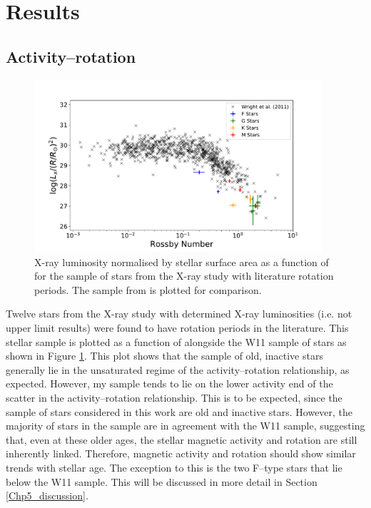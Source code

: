 \section{Results}

\subsection{Activity--rotation}
\label{Chp5_results_activity_rotation}

\begin{figure}[!ht]
    \centering
    \includegraphics[width=0.95\textwidth]{Figures/5-Activity_rotation/lx_v_R0.pdf}
    \caption[$L_{x}$ as a function of \Ro]{X-ray luminosity normalised by stellar surface area as a function of \Ro for the sample of stars from the X-ray study with literature rotation periods. The sample from \citet{Wright_etal_2011} is plotted for comparison.}
    \label{fig:lx_v_ro}
\end{figure}

Twelve stars from the X-ray study \citep{Booth_etal_2017} with determined X-ray luminosities (i.e. not upper limit results) were found to have rotation periods in the literature. This stellar sample is plotted as a function of \Ro alongside the W11 sample of stars as shown in Figure \ref{fig:lx_v_ro}. This plot shows that the sample of old, inactive stars generally lie in the unsaturated regime of the activity--rotation relationship, as expected. However, my sample tends to lie on the lower activity end of the scatter in the activity--rotation relationship. This is to be expected, since the sample of stars considered in this work are old and inactive stars. However, the majority of stars in the sample are in agreement with the W11 sample, suggesting that, even at these older ages, the stellar magnetic activity and rotation are still inherently linked. Therefore, magnetic activity and rotation should show similar trends with stellar age. The exception to this is the two F--type stars that lie below the W11 sample. This will be discussed in more detail in Section \ref{Chp5_discussion}.

